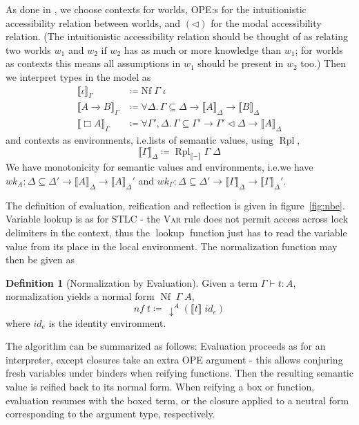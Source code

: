 \documentclass[12pt,twoside,openright]{report}
\numberwithin{equation}{chapter}
\numberwithin{figure}{chapter}
\numberwithin{table}{chapter}
\theoremstyle{definition}\newtheorem{definition}{Definition}
\begin{document}
As done in \cite{valliappan22}, we choose contexts for worlds,
OPE:s for the intuitionistic accessibility relation between worlds, and
$(\lhd)$ for the modal accessibility relation.
(The intuitionistic accessibility relation should be thought of as
relating two worlds $w_1$ and $w_2$ if $w_2$ has as much or more knowledge than $w_1$;
for worlds as contexts this means all assumptions in $w_1$ should be present in $w_2$ too.)
Then we interpret types in the model as
\begin{equation}\label{eq:sem-values}
  \begin{split}
  \llbracket \iota \rrbracket_\Gamma &\coloneqq \text{Nf} \; \Gamma \; \iota \\
  \llbracket A \to B \rrbracket_\Gamma &\coloneqq \forall \Delta. \, \Gamma \subseteq \Delta \to \llbracket A \rrbracket_\Delta \to \llbracket B \rrbracket_\Delta \\
  \llbracket \Box A \rrbracket_\Gamma &\coloneqq \forall \Gamma', \Delta. \, \Gamma \subseteq \Gamma' \to \Gamma'\lhd\Delta \to \llbracket A \rrbracket_\Delta
  \end{split}
\end{equation}
and contexts as environments, i.e.\@ lists of semantic values, using $\operatorname{Rpl}$,
$$ \llbracket \Gamma \rrbracket_\Delta \coloneqq \operatorname{Rpl}_{\llbracket-\rrbracket} \Gamma \; \Delta $$
We have monotonicity for semantic values and environments,
i.e.\@ we have
$wk_A : \Delta \subseteq \Delta' \to \llbracket A \rrbracket_\Delta \to \llbracket A \rrbracket_\Delta'$ and
$wk_\Gamma : \Delta \subseteq \Delta' \to \llbracket \Gamma \rrbracket_\Delta \to \llbracket \Gamma \rrbracket_\Delta'$.

The definition of evaluation, reification and reflection is given in figure~\ref{fig:nbe}.
Variable lookup is as for STLC -
the \textsc{Var} rule does not permit access across lock delimiters in the context,
thus the $\operatorname{lookup}$ function just has to read
the variable value from its place in the local environment.
The normalization function may then be given as
\begin{definition}[Normalization by Evaluation]
  Given a term $\Gamma \vdash t : A$,
  normalization yields a normal form $\operatorname{Nf} \; \Gamma \; A$,
  $$ \textit{nf} \; t \coloneqq \, \downarrow^A (\llbracket t \rrbracket \; \textit{id}_e) $$
  where $\textit{id}_e$ is the identity environment.
\end{definition}
The algorithm can be summarized as follows:
Evaluation proceeds as for an interpreter,
except closures take an extra OPE argument -
this allows conjuring fresh variables under binders
when reifying functions.
Then the resulting semantic value is reified back to its normal form.
When reifying a box or function,
evaluation resumes with the boxed term,
or the closure applied to a neutral form corresponding to the argument type,
respectively.
\end{document}
